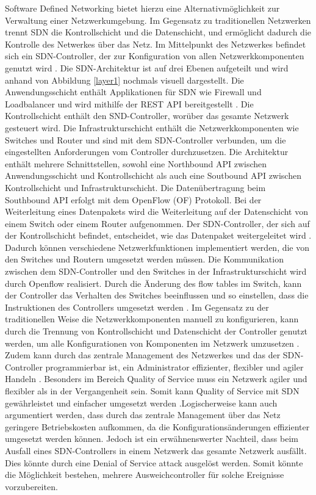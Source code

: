 \documentclass[fontsize=12pt,paper=a4,open=any,parskip=half,
  twoside=false,toc=listof,toc=bibliography,fleqn,leqno,
  captions=nooneline,captions=tableabove,british]{scrbook}
\begin{document}
Software Defined Networking bietet hierzu eine Alternativmöglichkeit zur Verwaltung einer Netzwerkumgebung. Im Gegensatz zu traditionellen Netzwerken trennt SDN die Kontrollschicht und die Datenschicht, und ermöglicht dadurch die Kontrolle des Netwerkes über das Netz. Im Mittelpunkt des Netzwerkes befindet sich ein SDN-Controller, der zur Konfiguration von allen Netzwerkkomponenten genutzt wird \cite{sdn1}. Die SDN-Architektur ist auf drei Ebenen aufgeteilt und wird anhand von Abbildung \ref{layer1} nochmals visuell dargestellt. Die Anwendungsschicht enthält Applikationen für SDN wie Firewall und Loadbalancer und wird mithilfe der REST API bereitgestellt \cite{james1}. Die Kontrollschicht enthält den SND-Controller, worüber das gesamte Netzwerk gesteuert wird. Die Infrastrukturschicht enthält die Netzwerkkomponenten wie Switches und Router und sind mit dem SDN-Controller verbunden, um die eingestellten Anforderungen vom Controller durchzusetzen. Die Architektur enthält mehrere Schnittstellen, sowohl eine Northbound API zwischen Anwendungsschicht und Kontrollschicht als auch eine Soutbound API zwischen Kontrollschicht und Infrastrukturschicht. Die Datenübertragung beim Southbound API erfolgt mit dem OpenFlow (OF) Protokoll. Bei der Weiterleitung eines Datenpakets wird die Weiterleitung auf der Datenschicht von einem Switch oder einem Router aufgenommen. Der SDN-Controller, der sich auf der Kontrollschicht befindet, entscheidet, wie das Datenpaket weitergeleitet wird \cite{james1}. Dadurch können verschiedene Netzwerkfunktionen implementiert werden, die von den Switches und Routern umgesetzt werden müssen. Die Kommunikation zwischen dem SDN-Controller und den Switches in der Infrastrukturschicht wird durch Openflow realisiert. Durch die Änderung des flow tables im Switch, kann der Controller das Verhalten des Switches beeinflussen und so einstellen, dass die Instruktionen des Controllers umgesetzt werden \cite{james1}. Im Gegensatz zu der traditionellen Weise die Netzwerkkomponenten manuell zu konfigurieren, kann durch die Trennung von Kontrollschicht und Datenschicht der Controller genutzt werden, um alle Konfigurationen von Komponenten im Netzwerk umzusetzen \cite{james3}. Zudem kann durch das zentrale Management des Netzwerkes und das der SDN-Controller programmierbar ist, ein Administrator effizienter, flexibler und agiler Handeln \cite{james1}. Besonders im Bereich Quality of Service muss ein Netzwerk agiler und flexibler als in der Vergangenheit sein. Somit kann Quality of Service mit SDN gewährleistet und einfacher umgesetzt werden \cite{james5}.Logischerweise kann auch argumentiert werden, dass durch das zentrale Management über das Netz geringere Betriebskosten aufkommen, da die Konfigurationsänderungen effizienter umgesetzt werden können.  Jedoch ist ein erwähnenswerter Nachteil, dass beim Ausfall eines SDN-Controllers in einem Netzwerk das gesamte Netzwerk ausfällt. Dies könnte durch eine Denial of Service attack ausgelöst werden. Somit könnte die Möglichkeit bestehen, mehrere Ausweichcontroller für solche Ereignisse vorzubereiten.
\newpage
\end{document}
